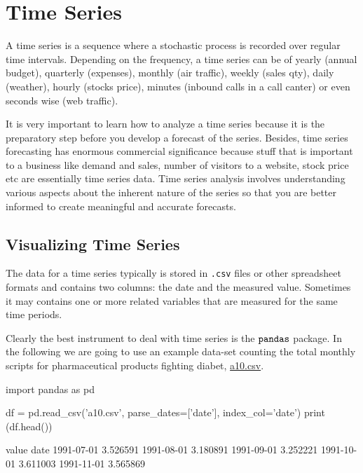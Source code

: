\chapter{Time Series}\label{time-series}

A time series is a sequence where a stochastic process is recorded over regular time intervals. Depending on the frequency, a time series can be of yearly (annual budget), quarterly (expenses), monthly (air traffic), weekly (sales qty), daily (weather), hourly (stocks price), minutes (inbound calls in a call canter) or even seconds wise (web traffic).

It is very important to learn how to analyze a time series because it is the preparatory step before you develop a forecast of the series. Besides, time series forecasting has enormous commercial significance because stuff that is important to a business like demand and sales, number of visitors to a website, stock price etc are essentially time series data. Time series analysis involves understanding various aspects about the inherent nature of the series so that you are better informed to create meaningful and accurate forecasts.

\section{Visualizing Time Series}\label{visualizing-time-series}

The data for a time series typically is stored in \texttt{.csv} files or other spreadsheet formats and contains two columns: the date and the measured value. Sometimes it may contains one or more related variables that are measured for the same time periods.

Clearly the best instrument to deal with time series is the \(\tt{pandas}\) package. In the following we are going to use an example data-set counting the total monthly scripts for pharmaceutical products fighting diabet, \href{https://raw.githubusercontent.com/matteosan1/finance_course/develop/libro/input_files/a10.csv}{a10.csv}.

\begin{ipython}
import pandas as pd

df = pd.read_csv('a10.csv', parse_dates=['date'], index_col='date')
print (df.head())
\end{ipython}
\begin{ioutput}
               value
date
1991-07-01  3.526591
1991-08-01  3.180891
1991-09-01  3.252221
1991-10-01  3.611003
1991-11-01  3.565869
\end{ioutput}
        
